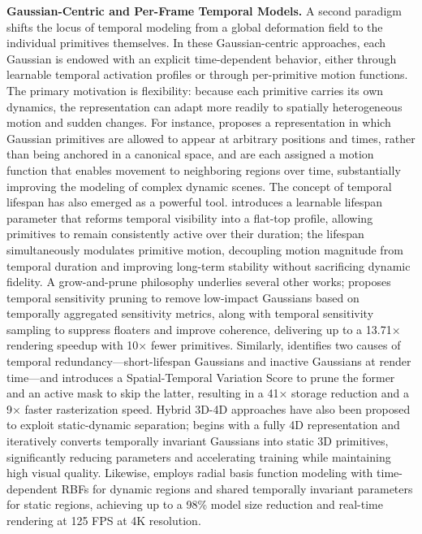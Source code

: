 \documentclass[11pt]{article}
\begin{document}
\textbf{Gaussian-Centric and Per-Frame Temporal Models.} A second paradigm shifts the locus of temporal modeling from a global deformation field to the individual primitives themselves. In these Gaussian-centric approaches, each Gaussian is endowed with an explicit time-dependent behavior, either through learnable temporal activation profiles or through per-primitive motion functions. The primary motivation is flexibility: because each primitive carries its own dynamics, the representation can adapt more readily to spatially heterogeneous motion and sudden changes. For instance, \cite{ref332} proposes a representation in which Gaussian primitives are allowed to appear at arbitrary positions and times, rather than being anchored in a canonical space, and are each assigned a motion function that enables movement to neighboring regions over time, substantially improving the modeling of complex dynamic scenes. The concept of temporal lifespan has also emerged as a powerful tool. \cite{ref333} introduces a learnable lifespan parameter that reforms temporal visibility into a flat-top profile, allowing primitives to remain consistently active over their duration; the lifespan simultaneously modulates primitive motion, decoupling motion magnitude from temporal duration and improving long-term stability without sacrificing dynamic fidelity. A grow-and-prune philosophy underlies several other works; \cite{ref334} proposes temporal sensitivity pruning to remove low-impact Gaussians based on temporally aggregated sensitivity metrics, along with temporal sensitivity sampling to suppress floaters and improve coherence, delivering up to a 13.71× rendering speedup with 10× fewer primitives. Similarly, \cite{ref335} identifies two causes of temporal redundancy---short-lifespan Gaussians and inactive Gaussians at render time---and introduces a Spatial-Temporal Variation Score to prune the former and an active mask to skip the latter, resulting in a 41× storage reduction and a 9× faster rasterization speed. Hybrid 3D-4D approaches have also been proposed to exploit static-dynamic separation; \cite{ref336} begins with a fully 4D representation and iteratively converts temporally invariant Gaussians into static 3D primitives, significantly reducing parameters and accelerating training while maintaining high visual quality. Likewise, \cite{ref337} employs radial basis function modeling with time-dependent RBFs for dynamic regions and shared temporally invariant parameters for static regions, achieving up to a 98\% model size reduction and real-time rendering at 125 FPS at 4K resolution.
\end{document}
